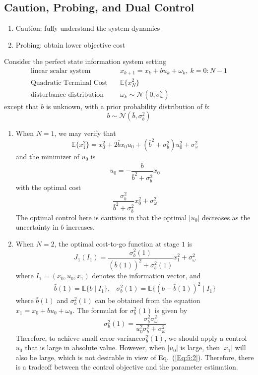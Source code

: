 \subsection{Caution, Probing, and Dual Control}
\begin{enumerate}
\item
Caution: fully understand the system dynamics
\item
Probing: obtain lower objective cost
\end{enumerate}
\begin{example}
Consider the perfect state information system setting
\begin{align*}
\text{linear scalar system}\quad&x_{k+1}=x_k+bu_k+\omega_k,\ k=0:N-1\\
\text{Quadratic Terminal Cost}\quad&\mathbb{E}\{x_N^2\}\\
\text{disturbance distribution}\quad&\omega_k\sim\mathcal{N}(0,\sigma^2_{\omega})
\end{align*}
except that $b$ is unknown, with a prior probability distribution of $b$:
\[
b\sim\mathcal{N}(\bar{b},\sigma_b^2)
\]
\begin{enumerate}
\item
When $N=1$, we may verify that 
\[
\mathbb{E}\{x_1^2\}=x_0^2+2\bar{b}x_0u_0+(\bar{b}^2+\sigma_b^2)u_0^2+\sigma_{\omega}^2
\]
and the minimizer of $u_0$ is
\[
u_0=-\frac{\bar{b}}{\bar{b}^2+\sigma_b^2}x_0
\]
with the optimal cost
\[
\frac{\sigma_b^2}{\bar{b}^2+\sigma_b^2}x_0^2+\sigma_{\omega}^2
\]
The optimal control here is cautious in that the optimal $|u_0|$ decreases as the uncertainty in $b$ increases.
\item
When $N=2$, the optimal cost-to-go function at stage $1$ is 
\begin{equation}\label{Eq:5:2}
J_1(I_1) = \frac{\sigma_b^2(1)}{(\bar{b}(1))^2+\sigma_b^2(1)}x_1^2+\sigma_{\omega}^2
\end{equation}
where $I_1=(x_0,u_0,x_1)$ denotes the information vector, and
\[
\begin{array}{ll}
\bar{b}(1)=\mathbb{E}\{b\mid I_1\},
&
\sigma_b^2(1)=\mathbb{E}\{(b-\bar{b}(1))^2\mid I_1\}
\end{array}
\]
where $\bar{b}(1)$ and $\sigma_b^2(1)$ can be obtained from the equation $x_1=x_0+bu_0+\omega_0$.
The formulat for $\sigma_b^2(1)$ is given by
\[
\sigma_b^2(1) = \frac{\sigma_b^2\sigma_{\omega}^2}{u_0^2\sigma_b^2+\sigma_{\omega}^2}
\]
Therefore, to achieve small error variance$\sigma_b^2(1)$, we should apply a control $u_0$ that is large in absolute value.
However, when $|u_0|$ is large, then $|x_1|$ will also be large, which is not desirable in view of Eq.~(\ref{Eq:5:2}).
Therefore, there is a tradeoff between the control objective and the parameter estimation.
\end{enumerate}
\end{example}

